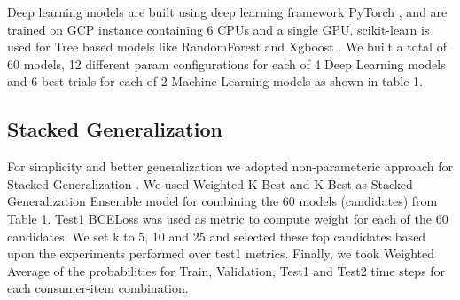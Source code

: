 Deep learning models are built using deep learning framework
PyTorch \cite{paszke2017automatic}, and are trained on GCP instance containing 6 CPUs and a single GPU. 
scikit-learn \cite{pedregosa2011scikit} is used for Tree
based models like RandomForest and Xgboost \cite{chen2016xgboost}. 
We built a total of 60 models, 12 different param configurations for each of 4 
Deep Learning models and 6 best trials for each of 2 Machine Learning models as shown in table 1.
\begin{center}
\begin{table}[!t]
\caption{Model Specifications}
\centering
{}
\end{table} 
\end{center}
\subsection{Stacked Generalization}
For simplicity and better generalization we adopted non-parameteric approach for Stacked Generalization \cite{wolpert1992stacked} .
We used Weighted K-Best and K-Best as Stacked Generalization Ensemble model for combining the 60 models (candidates) from Table 1. 
Test1 BCELoss was used as metric to compute weight for each of the 60 candidates. We set k to 5, 10 and 25 and selected 
these top candidates based upon the experiments performed over test1 metrics. Finally, we took Weighted Average of 
the probabilities for Train, Validation, Test1 and Test2 time steps for each consumer-item combination.

